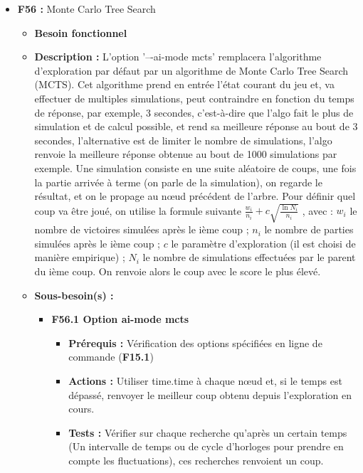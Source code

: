 \documentclass{article}
\begin{document}
\begin{itemize}
\begin{itemize}
\begin{itemize}
\begin{itemize}
            \end{itemize}
        \end{itemize} 
    \end{itemize}
\bigskip
    \item \label{MonteCarlo} \textbf{F56 :} Monte Carlo Tree Search
    \begin{itemize}
        \item \textbf{Besoin fonctionnel}
        \item \textbf{Description :} L’option ’–-ai-mode mcts’ remplacera l’algorithme d’exploration par défaut par un algorithme de Monte Carlo Tree Search (MCTS). Cet algorithme prend en entrée l’état courant du jeu et, va effectuer de multiples simulations, peut contraindre en fonction du temps de réponse, par exemple, 3 secondes, c'est-à-dire que l’algo fait le plus de simulation et de calcul possible, et rend sa meilleure réponse au bout de 3 secondes, l’alternative est de limiter le nombre de simulations, l’algo renvoie la meilleure réponse obtenue au bout de 1000 simulations par exemple.
        Une simulation consiste en une suite aléatoire de coups, une fois la partie arrivée à terme (on parle de la simulation), on regarde le résultat, et on le propage au nœud précédent de l’arbre. Pour définir quel coup va être joué, on utilise la formule suivante $\frac{w_i}{n_i} + c \sqrt{\frac{\ln N_i}{n_i}}$ \cite{10.1007/11871842_29}, avec : $w_i$ le nombre de victoires simulées après le ième coup ; $n_i$ le nombre de parties simulées après le ième coup ; $c$ le paramètre d’exploration (il est choisi de manière empirique) ; $N_i$ le nombre de simulations effectuées par le parent du ième coup.
        On renvoie alors le coup avec le score le plus élevé.
        \item \textbf{Sous-besoin(s) :}
        \begin{itemize}
            \smallskip
            \item \textbf{F56.1 Option ai-mode mcts}
            \begin{itemize}
                \item \textbf{Prérequis :} Vérification des options spécifiées en ligne de commande (\textbf{F15.1})
                \item \textbf{Actions :} Utiliser time.time à chaque nœud et, si le temps est dépassé, renvoyer le meilleur coup obtenu depuis l’exploration en cours.
                \item \textbf{Tests :} Vérifier sur chaque recherche qu’après un certain temps (Un intervalle de temps ou de cycle d’horloges pour prendre en compte les fluctuations), ces recherches renvoient un coup.

\end{itemize}
\end{itemize}
\end{itemize}
\end{itemize}
\end{document}
